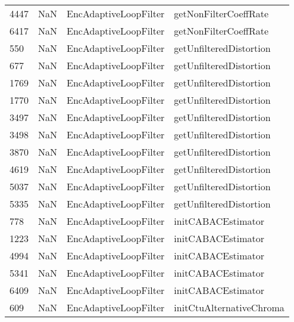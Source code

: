 \begin{tabular}{llll}
4447 &                   NaN &      EncAdaptiveLoopFilter &                     getNonFilterCoeffRate \\
6417 &                   NaN &      EncAdaptiveLoopFilter &                     getNonFilterCoeffRate \\
550  &                   NaN &      EncAdaptiveLoopFilter &                   getUnfilteredDistortion \\
677  &                   NaN &      EncAdaptiveLoopFilter &                   getUnfilteredDistortion \\
1769 &                   NaN &      EncAdaptiveLoopFilter &                   getUnfilteredDistortion \\
1770 &                   NaN &      EncAdaptiveLoopFilter &                   getUnfilteredDistortion \\
3497 &                   NaN &      EncAdaptiveLoopFilter &                   getUnfilteredDistortion \\
3498 &                   NaN &      EncAdaptiveLoopFilter &                   getUnfilteredDistortion \\
3870 &                   NaN &      EncAdaptiveLoopFilter &                   getUnfilteredDistortion \\
4619 &                   NaN &      EncAdaptiveLoopFilter &                   getUnfilteredDistortion \\
5037 &                   NaN &      EncAdaptiveLoopFilter &                   getUnfilteredDistortion \\
5335 &                   NaN &      EncAdaptiveLoopFilter &                   getUnfilteredDistortion \\
778  &                   NaN &      EncAdaptiveLoopFilter &                        initCABACEstimator \\
1223 &                   NaN &      EncAdaptiveLoopFilter &                        initCABACEstimator \\
4994 &                   NaN &      EncAdaptiveLoopFilter &                        initCABACEstimator \\
5341 &                   NaN &      EncAdaptiveLoopFilter &                        initCABACEstimator \\
6409 &                   NaN &      EncAdaptiveLoopFilter &                        initCABACEstimator \\
609  &                   NaN &      EncAdaptiveLoopFilter &                  initCtuAlternativeChroma \\

\end{tabular}
